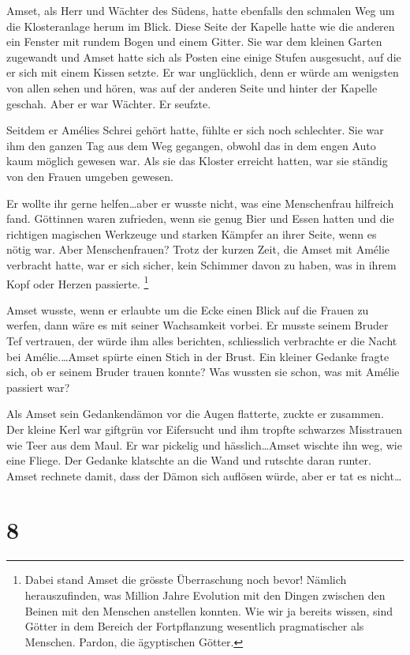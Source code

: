 Amset, als Herr und Wächter des Südens, hatte ebenfalls den schmalen Weg um die Klosteranlage herum im Blick. Diese Seite der Kapelle hatte wie die anderen ein Fenster mit rundem Bogen und einem Gitter. Sie war dem kleinen Garten zugewandt und Amset hatte sich als Posten eine einige Stufen ausgesucht, auf die er sich mit einem Kissen setzte. Er war unglücklich, denn er würde am wenigsten von allen sehen und hören, was auf der anderen Seite und hinter der Kapelle geschah. Aber er war Wächter. Er seufzte.

Seitdem er Amélies Schrei gehört hatte, fühlte er sich noch schlechter. Sie war ihm den ganzen Tag aus dem Weg gegangen, obwohl das in dem engen Auto kaum möglich gewesen war. Als sie das Kloster erreicht hatten, war sie ständig von den Frauen umgeben gewesen. 

Er wollte ihr gerne helfen\dots aber er wusste nicht, was eine Menschenfrau hilfreich fand. Göttinnen waren zufrieden, wenn sie genug Bier und Essen hatten und die richtigen magischen Werkzeuge und starken Kämpfer an ihrer Seite, wenn es nötig war. Aber Menschenfrauen? Trotz der kurzen Zeit, die Amset mit Amélie verbracht hatte, war er sich sicher, kein Schimmer davon zu haben, was in ihrem Kopf oder Herzen passierte. \footnote{Dabei stand Amset die grösste Überraschung noch bevor! Nämlich herauszufinden, was Million Jahre Evolution mit den Dingen zwischen den Beinen mit den Menschen anstellen konnten. Wie wir ja bereits wissen, sind Götter in dem Bereich der Fortpflanzung wesentlich pragmatischer als Menschen. Pardon, die ägyptischen Götter.} 

 Amset wusste, wenn er erlaubte um die Ecke einen Blick auf die Frauen zu werfen, dann wäre es mit seiner Wachsamkeit vorbei. Er musste seinem Bruder Tef vertrauen, der würde ihm alles berichten, schliesslich verbrachte er die Nacht bei Amélie.\dots Amset spürte einen Stich in der Brust. Ein kleiner Gedanke fragte sich, ob er seinem Bruder trauen konnte? Was wussten sie schon, was mit Amélie passiert war?

Als Amset sein Gedankendämon vor die Augen flatterte, zuckte er zusammen. Der kleine Kerl war giftgrün vor Eifersucht und ihm  tropfte schwarzes Misstrauen wie Teer aus dem Maul. Er war pickelig und hässlich\dots Amset wischte ihn weg, wie  eine Fliege. Der Gedanke klatschte an die Wand und rutschte daran runter. Amset rechnete damit, dass der Dämon sich auflösen würde, aber er tat es nicht\dots

\section*{8}


